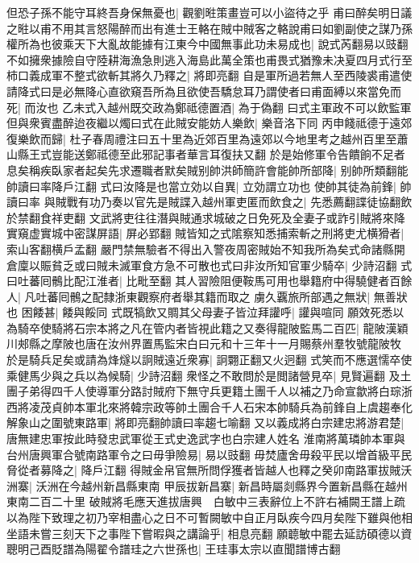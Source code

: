 但恐子孫不能守耳終吾身保無憂也|{
	觀劉暀策畫豈可以小盜待之乎}
甫曰醉矣明日議之暀以甫不用其言怒陽醉而出有進士王輅在賊中賊客之輅說甫曰如劉副使之謀乃孫權所為也彼乘天下大亂故能據有江東今中國無事此功未易成也|{
	說式芮翻易以豉翻}
不如擁衆據險自守陸耕海漁急則逃入海島此萬全策也甫畏式猶豫未决夏四月式行至柿口義成軍不整式欲斬其將久乃釋之|{
	將即亮翻}
自是軍所過若無人至西陵裘甫遣使請降式曰是必無降心直欲窺吾所為且欲使吾驕怠耳乃謂使者曰甫面縛以來當免而死|{
	而汝也}
乙未式入越州既交政為鄭祗德置酒|{
	為于偽翻}
曰式主軍政不可以飲監軍但與衆賓盡醉迨夜繼以燭曰式在此賊安能妨人樂飲|{
	樂音洛下同}
丙申餞祗德于遠郊復樂飲而歸|{
	杜子春周禮注曰五十里為近郊百里為遠郊以今地里考之越州百里至蕭山縣王式豈能送鄭祗德至此邪記事者華言耳復扶又翻}
於是始修軍令告饋餉不足者息矣稱疾臥家者起矣先求遷職者默矣賊别帥洪師簡許會能帥所部降|{
	别帥所類翻能帥讀曰率降戶江翻}
式曰汝降是也當立効以自異|{
	立効謂立功也}
使帥其徒為前鋒|{
	帥讀曰率}
與賊戰有功乃奏以官先是賊諜入越州軍吏匿而飲食之|{
	先悉薦翻諜徒協翻飲於禁翻食祥吏翻}
文武將吏往往潛與賊通求城破之日免死及全妻子或詐引賊將來降實窺虚實城中密謀屏語|{
	屏必郢翻}
賊皆知之式隂察知悉捕索斬之刑將吏尤横猾者|{
	索山客翻横戶孟翻}
嚴門禁無驗者不得出入警夜周密賊始不知我所為矣式命諸縣開倉廩以賑貧乏或曰賊未滅軍食方急不可散也式曰非汝所知官軍少騎卒|{
	少詩沼翻}
式曰吐蕃囘鶻比配江淮者|{
	比毗至翻}
其人習險阻便鞍馬可用也舉籍府中得驍健者百餘人|{
	凡吐蕃囘鶻之配隸浙東觀察府者舉其籍而取之}
虜久覊旅所部遇之無狀|{
	無善狀也}
困餧甚|{
	餧與餒同}
式既犒飲又賙其父母妻子皆泣拜讙呼|{
	讙與喧同}
願效死悉以為騎卒使騎將石宗本將之凡在管内者皆視此籍之又奏得龍陂監馬二百匹|{
	龍陂漢穎川郟縣之摩陂也唐在汝州界置馬監宋白曰元和十三年十一月賜蔡州羣牧號龍陂牧}
於是騎兵足矣或請為烽燧以詗賊遠近衆寡|{
	詗翾正翻又火迥翻}
式笑而不應選懦卒使乘健馬少與之兵以為候騎|{
	少詩沼翻}
衆怪之不敢問於是閲諸營見卒|{
	見賢遍翻}
及土團子弟得四千人使導軍分路討賊府下無守兵更籍土團千人以補之乃命宣歙將白琮浙西將凌茂貞帥本軍北來將韓宗政等帥土團合千人石宋本帥騎兵為前鋒自上虞趨奉化解象山之圍號東路軍|{
	將即亮翻帥讀曰率趨七喻翻}
又以義成將白宗建忠將游君楚|{
	唐無建忠軍按此時發忠武軍從王式史逸武字也白宗建人姓名}
淮南將萬璘帥本軍與台州唐興軍合號南路軍令之曰毋爭險易|{
	易以豉翻}
毋焚廬舍毋殺平民以增首級平民脅從者募降之|{
	降戶江翻}
得賊金帛官無所問俘獲者皆越人也釋之癸卯南路軍拔賊沃洲寨|{
	沃洲在今越州新昌縣東南}
甲辰拔新昌寨|{
	新昌時屬剡縣界今置新昌縣在越州東南二百二十里}
破賊將毛應天進拔唐興　白敏中三表辭位上不許右補闕王譜上疏以為陛下致理之初乃宰相盡心之日不可暫闕敏中自正月臥疾今四月矣陛下雖與他相坐語未嘗三刻天下之事陛下嘗暇與之講論乎|{
	相息亮翻}
願聼敏中罷去延訪碩德以資聰明己酉貶譜為陽翟令譜珪之六世孫也|{
	王珪事太宗以直聞譜博古翻}
